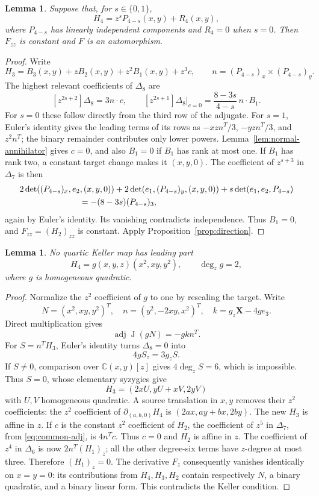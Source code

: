 \documentclass[11pt,reqno]{amsart}
\numberwithin{equation}{section}
\theoremstyle{plain}
\newtheorem{lemma}[theorem]{Lemma}
\theoremstyle{definition}
\theoremstyle{remark}
\newcommand{\C}{\mathbb C}
\newcommand{\adj}{\operatorname{adj}}
\newcommand{\J}{\operatorname J}
\newcommand{\XX}{\boldsymbol X}
\begin{document}
\begin{lemma}\label{lem:binary-leading}\label{lem:affine-leading}
Suppose that, for $s\in\{0,1\}$,
\[
H_4=z^sP_{4-s}(x,y)+R_4(x,y),
\]
where $P_{4-s}$ has linearly independent components and $R_4=0$ when $s=0$.
Then $F_{zz}$ is constant and $F$ is an automorphism.
\end{lemma}
\begin{proof}
Write
\[
H_3=B_3(x,y)+zB_2(x,y)+z^2B_1(x,y)+z^3c,
\qquad n=(P_{4-s})_x\times(P_{4-s})_y.
\]
The highest relevant coefficients of $\Delta_8$ are
\[
[z^{2s+2}]\Delta_8=3n\cdot c,
\qquad
[z^{2s+1}]\Delta_8\big|_{c=0}
=\frac{8-3s}{4-s}\,n\cdot B_1.
\]
For $s=0$ these follow directly from the third row of the adjugate.
For $s=1$, Euler's identity gives the leading terms of its rows as
$-xz n^T/3$, $-yz n^T/3$, and $z^2n^T$; the binary remainder contributes only lower powers.
Lemma~\ref{lem:normal-annihilator} gives $c=0$, and also $B_1=0$ if $B_1$ has rank at most one.
If $B_1$ has rank two, a constant target change makes it $(x,y,0)$.
The coefficient of $z^{s+3}$ in $\Delta_7$ is then
\begin{align*}
&2\det((P_{4-s})_x,e_2,(x,y,0))
+2\det(e_1,(P_{4-s})_y,(x,y,0))
+s\det(e_1,e_2,P_{4-s})\\
&\hspace{25mm}=-(8-3s)(P_{4-s})_3,
\end{align*}
again by Euler's identity. Its vanishing contradicts independence.
Thus $B_1=0$, and $F_{zz}=(H_2)_{zz}$ is constant.
Apply Proposition~\ref{prop:direction}.
\end{proof}

\begin{lemma}\label{lem:common-factor}
No quartic Keller map has leading part
\[
H_4=g(x,y,z)(x^2,xy,y^2),\qquad \deg_zg=2,
\]
where $g$ is homogeneous quadratic.
\end{lemma}
\begin{proof}
Normalize the $z^2$ coefficient of $g$ to one by rescaling the target. Write
\[
N=(x^2,xy,y^2)^T,\quad n=(y^2,-2xy,x^2)^T,
\quad k=g_z\XX-4ge_3.
\]
Direct multiplication gives
\begin{equation}\label{eq:common-adj}
\adj\J(gN)=-gkn^T.
\end{equation}
For $S=n^TH_3$, Euler's identity turns $\Delta_8=0$ into
\[
4gS_z=3g_zS.
\]
If $S\ne0$, comparison over $\C(x,y)[z]$ gives $4\deg_zS=6$, which is impossible. Thus $S=0$, whose elementary syzygies give
\[
H_3=(2xU,yU+xV,2yV)
\]
with $U,V$ homogeneous quadratic. A source translation in $x,y$ removes their $z^2$ coefficients: the $z^2$ coefficient of $\partial_{(a,b,0)}H_4$ is $(2ax,ay+bx,2by)$. The new $H_3$ is affine in $z$.
If $c$ is the constant $z^2$ coefficient of $H_2$, the coefficient of $z^5$ in $\Delta_7$, from \eqref{eq:common-adj}, is $4n^Tc$. Thus $c=0$ and $H_2$ is affine in $z$. The coefficient of $z^4$ in $\Delta_6$ is now $2n^T(H_1)_z$; all the other degree-six terms have $z$-degree at most three. Therefore $(H_1)_z=0$.
The derivative $F_z$ consequently vanishes identically on $x=y=0$: its contributions from $H_4,H_3,H_2$ contain respectively $N$, a binary quadratic, and a binary linear form. This contradicts the Keller condition.
\end{proof}
\end{document}
